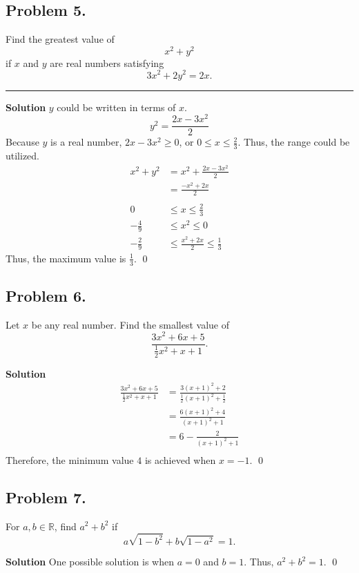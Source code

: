 \documentclass{article}
\newenvironment{solution}{\begin{trivlist}\item[]{\bf Solution}}{\qed \end{trivlist}}
\newcommand{\MyLine}{\noindent\rule{0.99\textwidth}{0.4pt}}
\begin{document}
\subsection*{Problem 5.}
{\color {Gray}
Find the greatest value of
\[
x^2 + y^2
\]
if $x$ and $y$ are real numbers satisfying
\[
3x^2 + 2y^2 = 2x.
\]
}
\MyLine
\begin{solution}
$y$ could be written in terms of $x$.
\[
y^2 = \frac{2x - 3x^2}{2}
\]
Because $y$ is a real number, $2x - 3x^2 \geq 0$,
or $0 \leq x \leq \frac{2}{3}$. Thus, the range could
be utilized.
\begin{align*}
    x^2 + y^2
    &= x^2 + \frac{2x - 3x^2}{2} \\
    &= \frac{-x^2 + 2x}{2}
    \\\\
    0 &\leq x \leq \frac{2}{3} \\
    -\frac{4}{9} &\leq x^2 \leq 0 \\
    -\frac{2}{9} &\leq \frac{x^2 + 2x}{2} \leq \frac{1}{3}
\end{align*}
Thus, the maximum value is $\boxed{\frac{1}{3}}$.
\end{solution}

\subsection*{Problem 6.}
{\color {Gray}
Let $x$ be any real number. Find the smallest value of
\[
\frac{3x^2 + 6x + 5}{\frac{1}{2}x^2 + x + 1}.
\]
}
\begin{solution}
\begin{align*}
    \frac{3x^2 + 6x + 5}{\frac{1}{2}x^2 + x + 1}
    &= \frac{3(x + 1)^2 + 2}{\frac{1}{2}(x + 1)^2 + \frac{1}{2}} \\
    &= \frac{6(x + 1)^2 + 4}{(x + 1)^2 + 1} \\
    &= 6 - \frac{2}{(x + 1)^2 + 1} \\
\end{align*}
Therefore, the minimum value $\boxed{4}$ is achieved when $x = -1$.
\end{solution}

\subsection*{Problem 7.}
{\color {Gray}
For $a, b \in \mathbb{R}$, find $a^2 + b^2$ if
\[
a\sqrt{1 - b^2} + b\sqrt{1 - a^2} = 1.
\]
}
\begin{solution}
One possible solution is when $a = 0$ and $b = 1$.
Thus, $a^2 + b^2 = \boxed{1}$.
\end{solution}
\end{document}
